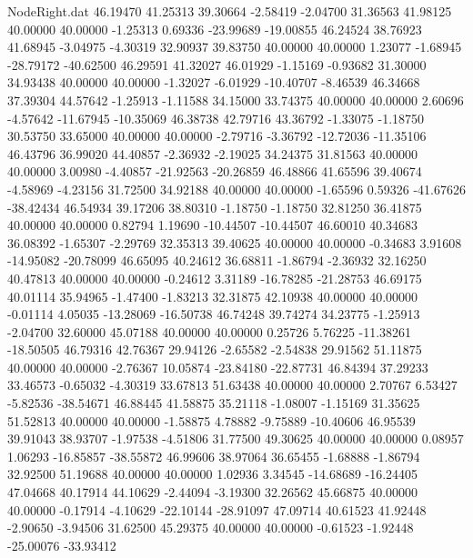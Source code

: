 \begin{filecontents}{NodeRight.dat}
  46.19470   41.25313   39.30664    -2.58419   -2.04700   31.36563   41.98125   40.00000   40.00000   -1.25313    0.69336  -23.99689  -19.00855
  46.24524   38.76923   41.68945    -3.04975   -4.30319   32.90937   39.83750   40.00000   40.00000    1.23077   -1.68945  -28.79172  -40.62500
  46.29591   41.32027   46.01929    -1.15169   -0.93682   31.30000   34.93438   40.00000   40.00000   -1.32027   -6.01929  -10.40707   -8.46539
  46.34668   37.39304   44.57642    -1.25913   -1.11588   34.15000   33.74375   40.00000   40.00000    2.60696   -4.57642  -11.67945  -10.35069
  46.38738   42.79716   43.36792    -1.33075   -1.18750   30.53750   33.65000   40.00000   40.00000   -2.79716   -3.36792  -12.72036  -11.35106
  46.43796   36.99020   44.40857    -2.36932   -2.19025   34.24375   31.81563   40.00000   40.00000    3.00980   -4.40857  -21.92563  -20.26859
  46.48866   41.65596   39.40674    -4.58969   -4.23156   31.72500   34.92188   40.00000   40.00000   -1.65596    0.59326  -41.67626  -38.42434
  46.54934   39.17206   38.80310    -1.18750   -1.18750   32.81250   36.41875   40.00000   40.00000    0.82794    1.19690  -10.44507  -10.44507
  46.60010   40.34683   36.08392    -1.65307   -2.29769   32.35313   39.40625   40.00000   40.00000   -0.34683    3.91608  -14.95082  -20.78099
  46.65095   40.24612   36.68811    -1.86794   -2.36932   32.16250   40.47813   40.00000   40.00000   -0.24612    3.31189  -16.78285  -21.28753
  46.69175   40.01114   35.94965    -1.47400   -1.83213   32.31875   42.10938   40.00000   40.00000   -0.01114    4.05035  -13.28069  -16.50738
  46.74248   39.74274   34.23775    -1.25913   -2.04700   32.60000   45.07188   40.00000   40.00000    0.25726    5.76225  -11.38261  -18.50505
  46.79316   42.76367   29.94126    -2.65582   -2.54838   29.91562   51.11875   40.00000   40.00000   -2.76367   10.05874  -23.84180  -22.87731
  46.84394   37.29233   33.46573    -0.65032   -4.30319   33.67813   51.63438   40.00000   40.00000    2.70767    6.53427   -5.82536  -38.54671
  46.88445   41.58875   35.21118    -1.08007   -1.15169   31.35625   51.52813   40.00000   40.00000   -1.58875    4.78882   -9.75889  -10.40606
  46.95539   39.91043   38.93707    -1.97538   -4.51806   31.77500   49.30625   40.00000   40.00000    0.08957    1.06293  -16.85857  -38.55872
  46.99606   38.97064   36.65455    -1.68888   -1.86794   32.92500   51.19688   40.00000   40.00000    1.02936    3.34545  -14.68689  -16.24405
  47.04668   40.17914   44.10629    -2.44094   -3.19300   32.26562   45.66875   40.00000   40.00000   -0.17914   -4.10629  -22.10144  -28.91097
  47.09714   40.61523   41.92448    -2.90650   -3.94506   31.62500   45.29375   40.00000   40.00000   -0.61523   -1.92448  -25.00076  -33.93412

\end{filecontents}
